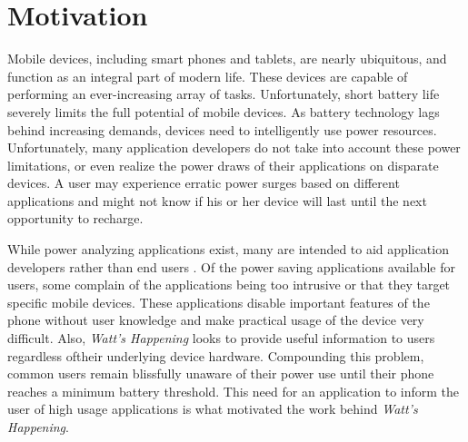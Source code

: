 \section{Motivation}
\label{sec:motivation}
Mobile devices, including smart phones and tablets, are nearly ubiquitous, and function as an integral part of modern life. 
These devices are capable of performing an ever-increasing array of tasks. 
Unfortunately, short battery life severely limits the full potential of mobile devices. 
As battery technology lags behind increasing demands, devices need to intelligently use power resources. 
Unfortunately, many application developers do not take into account these power limitations, or even realize the power draws of their applications on disparate devices. 
A user may experience erratic power surges based on different applications and might not know if his or her device will last until the next opportunity to recharge. 

While power analyzing applications exist, many are intended to aid application developers rather than end users \cite{Pathak:2012:ESI:2168836.2168841} \cite{energy-aware}. 
Of the power saving applications available for users, some complain of the applications being too intrusive or that they target specific mobile devices. 
These applications disable important features of the phone without user knowledge and make practical usage of the device very difficult.
Also, \emph{Watt's Happening} looks to provide useful information to users regardless oftheir underlying device hardware.
Compounding this problem, common users remain blissfully unaware of their power use until their phone reaches a minimum battery threshold.
This need for an application to inform the user of high usage applications is what motivated the work behind \emph{Watt's Happening}.
